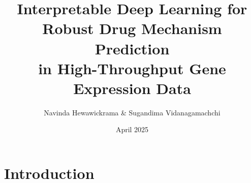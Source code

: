 \documentclass[twocolumn]{article}
\title{Interpretable Deep Learning for Robust Drug Mechanism Prediction \\ in High-Throughput Gene Expression Data}
\author{Navinda Hewawickrama \& Sugandima Vidanagamachchi}
\date{April 2025}
\begin{document}
\maketitle
\section{Introduction}
\end{document}
